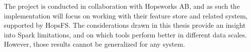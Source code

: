 The project is conducted in collaboration with Hopsworks AB, and as such the implementation will focus on working with their feature store and related system, supported by \gls{HopsFS}. The considerations drawn in this thesis provide an insight into Spark limitations, and on which tools perform better in different data scales. However, those results cannot be generalized for any system.